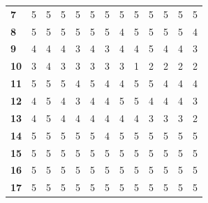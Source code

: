 \documentclass{article}
\begin{document}
\begin{table}[!htb]
\begin{minipage}{1\linewidth}
\begin{tabular}{|*{13}{p{0.5cm}|}}
			\textbf{7}  & 5            & 5            & 5            & 5            & 5            & 5            & 5            & 5            & 5            & 5            & 5            & 5            \\
			\textbf{8}  & 5            & 5            & 5            & 5            & 5            & 5            & 4            & 5            & 5            & 5            & 5            & 4            \\
			\textbf{9}  & 4            & 4            & 4            & 3            & 4            & 3            & 4            & 4            & 5            & 4            & 4            & 3            \\
			\textbf{10} & 3            & 4            & 3            & 3            & 3            & 3            & 3            & 1            & 2            & 2            & 2            & 2            \\
			\textbf{11} & 5            & 5            & 5            & 4            & 5            & 4            & 4            & 5            & 5            & 4            & 4            & 4            \\
			\textbf{12} & 4            & 5            & 4            & 3            & 4            & 4            & 5            & 5            & 4            & 4            & 4            & 3            \\
			\textbf{13} & 4            & 5            & 4            & 4            & 4            & 4            & 4            & 4            & 3            & 3            & 3            & 2            \\
			\textbf{14} & 5            & 5            & 5            & 5            & 5            & 4            & 5            & 5            & 5            & 5            & 5            & 5            \\
			\textbf{15} & 5            & 5            & 5            & 5            & 5            & 5            & 5            & 5            & 5            & 5            & 5            & 5            \\
			\textbf{16} & 5            & 5            & 5            & 5            & 5            & 5            & 5            & 5            & 5            & 5            & 5            & 5            \\
			\textbf{17} & 5            & 5            & 5            & 5            & 5            & 5            & 5            & 5            & 5            & 5            & 5            & 5            \\

\end{tabular}
\end{minipage}
\end{table}
\end{document}
